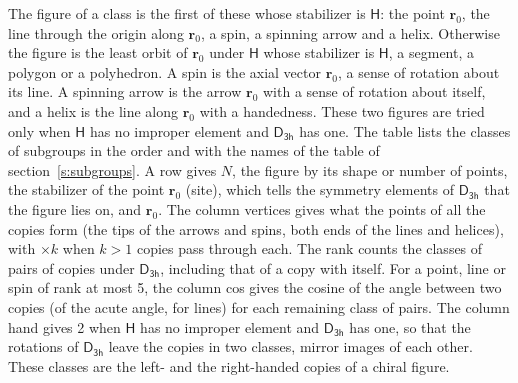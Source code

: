 \documentclass[10pt,a4paper]{article}
\numberwithin{equation}{section}
\newcommand{\grp}[1]{\mathsf{#1}}
\newcommand{\pointr}{\mathbf{r}}
\begin{document}
\leavevmode\label{n:head.figure}The figure of a class is the first of these whose stabilizer is $\grp{H}$: the point $\pointr_0$, the line through the origin along $\pointr_0$, a spin, a spinning arrow and a helix. Otherwise the figure is the least orbit of $\pointr_0$ under $\grp{H}$ whose stabilizer is $\grp{H}$, a segment, a polygon or a polyhedron. A spin is the axial vector $\pointr_0$, a sense of rotation about its line. A spinning arrow is the arrow $\pointr_0$ with a sense of rotation about itself, and a helix is the line along $\pointr_0$ with a handedness. These two figures are tried only when $\grp{H}$ has no improper element and $\grp{D_{3h}}$ has one. The table lists the classes of subgroups in the order and with the names of the table of section~\ref{s:subgroups}. \label{n:head.site}A row gives $N$, the figure by its shape or number of points, the stabilizer of the point $\pointr_0$ (site), which tells the symmetry elements of $\grp{D_{3h}}$ that the figure lies on, and $\pointr_0$. \label{n:head.vertices}The column vertices gives what the points of all the copies form (the tips of the arrows and spins, both ends of the lines and helices), with ${\times}k$ when $k > 1$ copies pass through each. \label{n:head.rank}The rank counts the classes of pairs of copies under $\grp{D_{3h}}$, including that of a copy with itself. \label{n:head.cos}For a point, line or spin of rank at most 5, the column cos gives the cosine of the angle between two copies (of the acute angle, for lines) for each remaining class of pairs. \label{n:head.hand}The column hand gives 2 when $\grp{H}$ has no improper element and $\grp{D_{3h}}$ has one, so that the rotations of $\grp{D_{3h}}$ leave the copies in two classes, mirror images of each other. These classes are the left- and the right-handed copies of a chiral figure.
\end{document}
